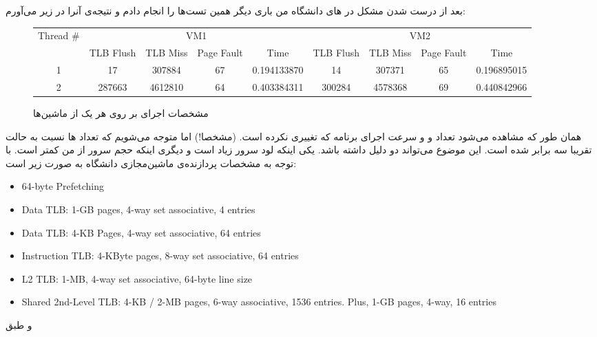 بعد از درست شدن مشکل
در
های
دانشگاه من باری دیگر همین تست‌ها را انجام دادم و نتیجه‌ی آنرا در زیر می‌آورم:
\begin{figure}[H]
    \small
    \centering
    \begin{latin}
    \begin{tabular}{|c|cccc|cccc|}
        \hline
        \multirow{2}{*}{Thread \#} & \multicolumn{4}{|c|}{VM1} & \multicolumn{4}{|c|}{VM2}\\
        & TLB Flush & TLB Miss & Page Fault & Time & TLB Flush & TLB Miss & Page Fault & Time\\
        \hline
        1 & 17&307884&67&0.194133870& 14&307371&65&0.196895015\\
        2 & 287663&4612810&64&0.403384311 & 300284&4578368&69&0.440842966\\
        \hline
    \end{tabular}
    \end{latin}
    \caption{مشخصات اجرای بر روی هر یک از ماشین‌ها}
\end{figure}
همان طور که مشاهده می‌شود تعداد
 و 
و سرعت اجرای برنامه که تغییری نکرده است. (مشخصا!)
اما متوجه می‌شویم که تعداد
ها
نسبت به حالت
تقریبا سه برابر شده است. این موضوع می‌تواند دو دلیل داشته باشد. یکی اینکه لود سرور زیاد است و دیگری
اینکه حجم
سرور از
من کمتر است. با توجه به
مشخصات
پردازنده‌ی ماشین‌مجازی دانشگاه به صورت زیر است:
\begin{latin}
    \begin{itemize}
        \item 64-byte Prefetching
        \item Data TLB: 1-GB pages, 4-way set associative, 4 entries
        \item Data TLB: 4-KB Pages, 4-way set associative, 64 entries
        \item Instruction TLB: 4-KByte pages, 8-way set associative, 64 entries
        \item L2 TLB: 1-MB, 4-way set associative, 64-byte line size
        \item Shared 2nd-Level TLB: 4-KB / 2-MB pages, 6-way associative, 1536 entries. Plus, 1-GB pages, 4-way, 16 entries
    \end{itemize}
\end{latin}
و طبق
